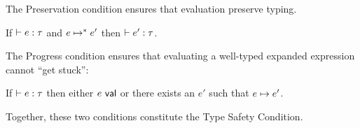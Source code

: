 The Preservation condition ensures that evaluation preserve typing.  

\begingroup
\def\thetheorem{\ref{condition:preservation-UP}}
\begin{condition}[Preservation] If $\vdash e : \tau$ and $e \mapsto^{*} e'$ then $\vdash e' : \tau$. \end{condition}
\endgroup
The Progress condition ensures that evaluating a well-typed expanded expression cannot ``get stuck'':
\begingroup
\def\thetheorem{\ref{condition:progress-UP}}
\begin{condition}[Progress] If $\vdash e : \tau$ then either $e~\mathsf{val}$ or there exists an $e'$ such that $e \mapsto e'$. \end{condition}
\endgroup
 Together, these two conditions constitute the Type Safety Condition.

\vspace{-8px}
